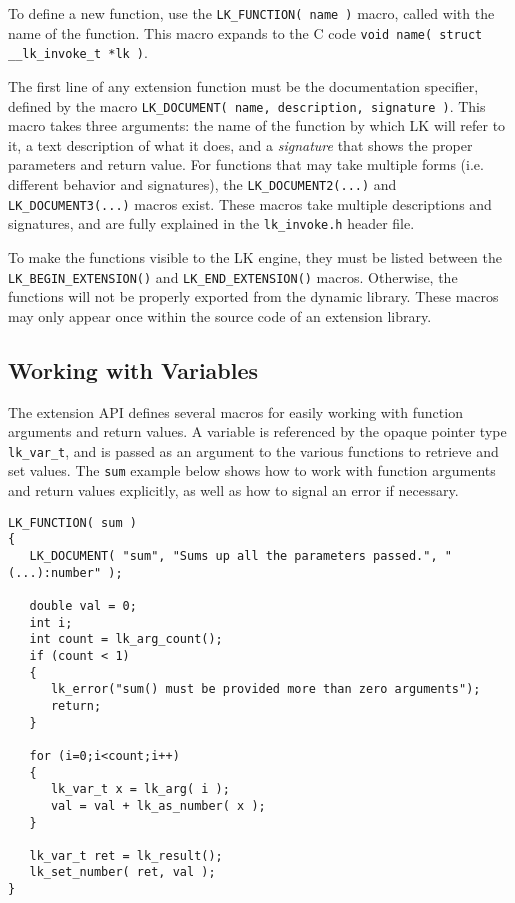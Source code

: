 \documentclass{article}
\begin{document}
To define a new function, use the \texttt{LK\_FUNCTION( name )} macro, called with the name of the function.  This macro expands to the C code \texttt{void name( struct \_\_lk\_invoke\_t *lk )}.

The first line of any extension function must be the documentation specifier, defined by the macro \texttt{LK\_DOCUMENT( name, description, signature )}.  This macro takes three arguments: the name of the function by which LK will refer to it, a text description of what it does, and a \emph{signature} that shows the proper parameters and return value.  For functions that may take multiple forms (i.e. different behavior and signatures), the \texttt{LK\_DOCUMENT2(...)} and \texttt{LK\_DOCUMENT3(...)} macros exist.  These macros take multiple descriptions and signatures, and are fully explained in the \texttt{lk\_invoke.h} header file.

To make the functions visible to the LK engine, they must be listed between the \texttt{LK\_BEGIN\_EXTENSION()} and \texttt{LK\_END\_EXTENSION()} macros.  Otherwise, the functions will not be properly exported from the dynamic library.  These macros may only appear once within the source code of an extension library.


\subsection{Working with Variables}

The extension API defines several macros for easily working with function arguments and return values.  A variable is referenced by the opaque pointer type \texttt{lk\_var\_t}, and is passed as an argument to the various functions to retrieve and set values.  The \texttt{sum} example below shows how to work with function arguments and return values explicitly, as well as how to signal an error if necessary.

\begin{verbatim}
LK_FUNCTION( sum )
{
   LK_DOCUMENT( "sum", "Sums up all the parameters passed.", "(...):number" );

   double val = 0;
   int i;
   int count = lk_arg_count();
   if (count < 1)
   {
      lk_error("sum() must be provided more than zero arguments");
      return;
   }

   for (i=0;i<count;i++)
   {
      lk_var_t x = lk_arg( i );
      val = val + lk_as_number( x );
   }

   lk_var_t ret = lk_result();
   lk_set_number( ret, val );
}
\end{verbatim}
\end{document}
